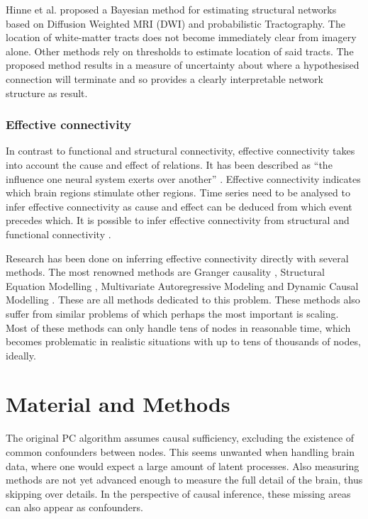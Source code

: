 \documentclass[a4paper, 10pt, english, onecolumn]{article}
\begin{document}
Hinne et al. \cite{hinne2013} proposed a Bayesian method for estimating structural networks based on Diffusion Weighted MRI (DWI) and probabilistic Tractography.
The location of white-matter tracts does not become immediately clear from imagery alone.
Other methods rely on thresholds to estimate location of said tracts.
The proposed method results in a measure of uncertainty about where a hypothesised connection will terminate and so provides a clearly interpretable network structure as result.

\subsubsection{Effective connectivity}
In contrast to functional and structural connectivity, effective connectivity takes into account the cause and effect of relations.
It has been described as ``the influence one neural system exerts over another'' \cite{friston1994}.
Effective connectivity indicates which brain regions stimulate other regions.
Time series need to be analysed to infer effective connectivity as cause and effect can be deduced from which event precedes which. 
It is possible to infer effective connectivity from structural and functional connectivity \cite{mclntosh1994, harrison2003, friston2003, roebroeck2005}.

Research has been done on inferring effective connectivity directly with several methods.
The most renowned methods are Granger causality \cite{roebroeck2005}, Structural Equation Modelling \cite{mclntosh1994}, Multivariate Autoregressive Modeling \cite{harrison2003} and Dynamic Causal Modelling \cite{friston2003}.
These are all methods dedicated to this problem.
These methods also suffer from similar problems of which perhaps the most important is scaling.
Most of these methods can only handle tens of nodes in reasonable time, which becomes problematic in realistic situations with up to tens of thousands of nodes, ideally.


\section{Material and Methods}
The original PC algorithm assumes causal sufficiency, excluding the existence of common confounders between nodes.
This seems unwanted when handling brain data, where one would expect a large amount of latent processes.
Also measuring methods are not yet advanced enough to measure the full detail of the brain, thus skipping over details.
In the perspective of causal inference, these missing areas can also appear as confounders.
\end{document}
